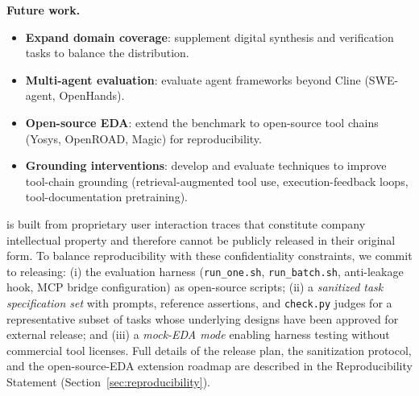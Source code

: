 \textbf{Future work.}
\begin{itemize}
    \item \textbf{Expand domain coverage}: supplement digital synthesis and verification tasks to balance the distribution.
    \item \textbf{Multi-agent evaluation}: evaluate agent frameworks beyond Cline (SWE-agent, OpenHands).
    \item \textbf{Open-source EDA}: extend the benchmark to open-source tool chains (Yosys, OpenROAD, Magic) for reproducibility.
    \item \textbf{Grounding interventions}: develop and evaluate techniques to improve tool-chain grounding (retrieval-augmented tool use, execution-feedback loops, tool-documentation pretraining).
\end{itemize}

\bench{} is built from proprietary user interaction traces that constitute company intellectual property and therefore cannot be publicly released in their original form. To balance reproducibility with these confidentiality constraints, we commit to releasing: (i) the evaluation harness (\texttt{run\_one.sh}, \texttt{run\_batch.sh}, anti-leakage hook, MCP bridge configuration) as open-source scripts; (ii) a \emph{sanitized task specification set} with prompts, reference assertions, and \texttt{check.py} judges for a representative subset of tasks whose underlying designs have been approved for external release; and (iii) a \emph{mock-EDA mode} enabling harness testing without commercial tool licenses. Full details of the release plan, the sanitization protocol, and the open-source-EDA extension roadmap are described in the Reproducibility Statement (Section~\ref{sec:reproducibility}).

